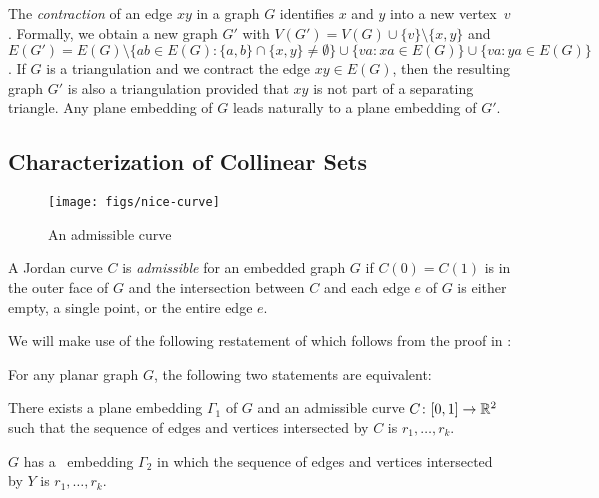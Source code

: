 The \emph{contraction} of an edge $xy$ in a graph $G$ identifies $x$
and $y$
into a new vertex~$v$.
Formally, we obtain a new graph $G'$ with
$V(G')=V(G)\cup\{v\}\setminus\{x,y\}$ and $E(G')=E(G)\setminus\{ab\in
E(G): \{a,b\}\cap\{x,y\}\neq\emptyset\}\cup\{va: xa\in E(G)\}\cup
\{va:ya\in E(G)\}$.  
If $G$ is a triangulation and we
contract the edge $xy\in E(G)$, then the resulting graph $G'$ is also
a triangulation provided that $xy$ is not part of a separating
triangle. %
Any plane embedding of $G$ leads naturally
to a plane embedding of $G'$.

\subsection{Characterization of Collinear Sets}


\begin{figure}[htb]
  \centering
  \texttt{[image: figs/nice-curve]}
  \caption{An admissible curve}
  \label{fig:admissible}
\end{figure}

A %
Jordan curve $C$ is \emph{admissible} for an
embedded graph $G$ if $C(0)=C(1)$ is in the outer face
of $G$ and the intersection between $C$ and each edge $e$ of $G$ is
either empty, a single point, or the entire edge $e$.  


We will make use of the following restatement of 
which follows from the proof in \cite{dalozzo.dujmovic.ea:drawing}:
\begin{thm}
	For any planar graph $G$, the following two statements are equivalent:
	\begin{compactenum}
		\item There exists a plane embedding $\Gamma_1$ of $G$ and an
		admissible curve $C\colon [0,1]\to\mathbb{R}^2$ such that the sequence of edges
		and vertices intersected by $C$ is $r_1,\ldots,r_k$.
		\item $G$ has a \Fary\ embedding $\Gamma_2$ in which the sequence
		of edges and vertices intersected by $Y$ is $r_1,\ldots,r_k$.
	\end{compactenum}
\end{thm}


